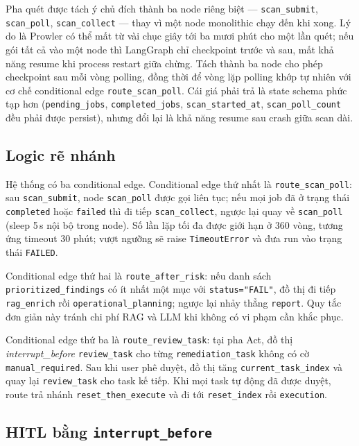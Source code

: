 Pha quét được tách ý chủ đích thành ba node riêng biệt — \texttt{scan\_submit}, \texttt{scan\_poll}, \texttt{scan\_collect} — thay vì một node monolithic chạy đến khi xong. Lý do là Prowler có thể mất từ vài chục giây tới ba mươi phút cho một lần quét; nếu gói tất cả vào một node thì LangGraph chỉ checkpoint trước và sau, mất khả năng resume khi process restart giữa chừng. Tách thành ba node cho phép checkpoint sau mỗi vòng polling, đồng thời để vòng lặp polling khớp tự nhiên với cơ chế conditional edge \texttt{route\_scan\_poll}. Cái giá phải trả là state schema phức tạp hơn (\texttt{pending\_jobs}, \texttt{completed\_jobs}, \texttt{scan\_started\_at}, \texttt{scan\_poll\_count} đều phải được persist), nhưng đổi lại là khả năng resume sau crash giữa scan dài.

\subsection{Logic rẽ nhánh}

Hệ thống có ba conditional edge. Conditional edge thứ nhất là \texttt{route\_scan\_poll}: sau \texttt{scan\_submit}, node \texttt{scan\_poll} được gọi liên tục; nếu mọi job đã ở trạng thái \texttt{completed} hoặc \texttt{failed} thì đi tiếp \texttt{scan\_collect}, ngược lại quay về \texttt{scan\_poll} (sleep 5\,s nội bộ trong node). Số lần lặp tối đa được giới hạn ở 360 vòng, tương ứng timeout 30 phút; vượt ngưỡng sẽ raise \texttt{TimeoutError} và đưa run vào trạng thái \texttt{FAILED}.

Conditional edge thứ hai là \texttt{route\_after\_risk}: nếu danh sách \texttt{prioritized\_findings} có ít nhất một mục với \texttt{status="FAIL"}, đồ thị đi tiếp \texttt{rag\_enrich} rồi \texttt{operational\_planning}; ngược lại nhảy thẳng \texttt{report}. Quy tắc đơn giản này tránh chi phí RAG và LLM khi không có vi phạm cần khắc phục.

Conditional edge thứ ba là \texttt{route\_review\_task}: tại pha Act, đồ thị \emph{interrupt\_before} \texttt{review\_task} cho từng \texttt{remediation\_task} không có cờ \texttt{manual\_required}. Sau khi user phê duyệt, đồ thị tăng \texttt{current\_task\_index} và quay lại \texttt{review\_task} cho task kế tiếp. Khi mọi task tự động đã được duyệt, route trả nhánh \texttt{reset\_then\_execute} và đi tới \texttt{reset\_index} rồi \texttt{execution}.

\subsection{HITL bằng \texttt{interrupt\_before}}

